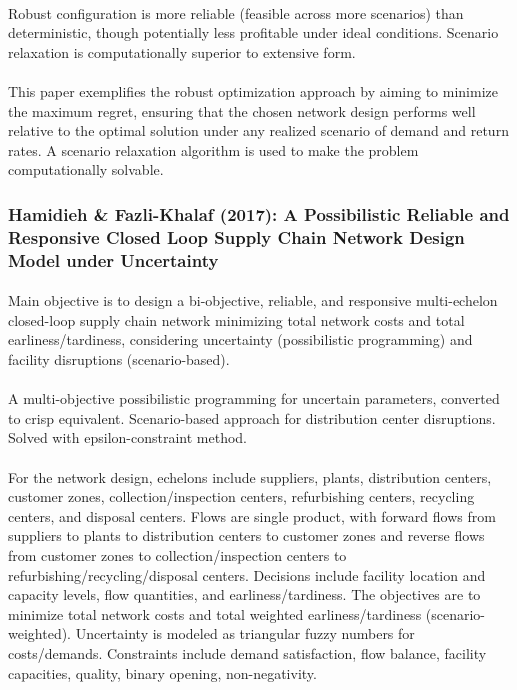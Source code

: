 \paragraph{} Robust configuration is more reliable (feasible across more scenarios) than deterministic, though potentially less profitable under ideal conditions. Scenario relaxation is computationally superior to extensive form.

\paragraph{} This paper exemplifies the robust optimization approach by aiming to minimize the maximum regret, ensuring that the chosen network design performs well relative to the optimal solution under any realized scenario of demand and return rates. A scenario relaxation algorithm is used to make the problem computationally solvable.

\subsubsection{Hamidieh \& Fazli-Khalaf (2017): A Possibilistic Reliable and Responsive Closed Loop Supply Chain Network Design Model under Uncertainty}

\paragraph{} Main objective is to design a bi-objective, reliable, and responsive multi-echelon closed-loop supply chain network minimizing total network costs and total earliness/tardiness, considering uncertainty (possibilistic programming) and facility disruptions (scenario-based).

\paragraph{} A multi-objective possibilistic programming for uncertain parameters, converted to crisp equivalent. Scenario-based approach for distribution center disruptions. Solved with epsilon-constraint method.

\paragraph{} For the network design, echelons include suppliers, plants, distribution centers, customer zones, collection/inspection centers, refurbishing centers, recycling centers, and disposal centers. Flows are single product, with forward flows from suppliers to plants to distribution centers to customer zones and reverse flows from customer zones to collection/inspection centers to refurbishing/recycling/disposal centers. Decisions include facility location and capacity levels, flow quantities, and earliness/tardiness. The objectives are to minimize total network costs and total weighted earliness/tardiness (scenario-weighted). Uncertainty is modeled as triangular fuzzy numbers for costs/demands. Constraints include demand satisfaction, flow balance, facility capacities, quality, binary opening, non-negativity.

